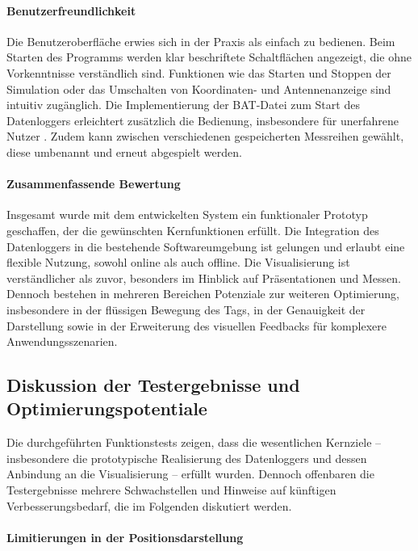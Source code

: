 \documentclass[a4paper, 12pt]{article} %
\begin{document}
\paragraph{Benutzerfreundlichkeit}
Die Benutzeroberfläche erwies sich in der Praxis als einfach zu bedienen. Beim Starten des Programms werden klar beschriftete Schaltflächen angezeigt, 
die ohne Vorkenntnisse verständlich sind. Funktionen wie das Starten und Stoppen der Simulation oder das Umschalten von Koordinaten- und Antennenanzeige 
sind intuitiv zugänglich. Die Implementierung der \ac{BAT}-Datei zum Start des Datenloggers erleichtert zusätzlich die Bedienung, insbesondere für unerfahrene
Nutzer \cite{nielsen_usability}. Zudem kann zwischen verschiedenen gespeicherten Messreihen gewählt, diese umbenannt und erneut abgespielt werden.

\paragraph{Zusammenfassende Bewertung}
Insgesamt wurde mit dem entwickelten System ein funktionaler Prototyp geschaffen, der die gewünschten Kernfunktionen erfüllt. Die Integration des 
Datenloggers in die bestehende Softwareumgebung ist gelungen und erlaubt eine flexible Nutzung, sowohl online als auch offline. Die Visualisierung 
ist verständlicher als zuvor, besonders im Hinblick auf Präsentationen und Messen. Dennoch bestehen in mehreren Bereichen Potenziale zur weiteren 
Optimierung, insbesondere in der flüssigen Bewegung des Tags, in der Genauigkeit der Darstellung sowie in der Erweiterung des visuellen Feedbacks für
komplexere Anwendungsszenarien.

\subsection{Diskussion der Testergebnisse und Optimierungspotentiale}

Die durchgeführten Funktionstests zeigen, dass die wesentlichen Kernziele – insbesondere die prototypische Realisierung des Datenloggers und 
dessen Anbindung an die Visualisierung – erfüllt wurden. Dennoch offenbaren die Testergebnisse mehrere Schwachstellen und Hinweise auf künftigen 
Verbesserungsbedarf, die im Folgenden diskutiert werden.

\paragraph{Limitierungen in der Positionsdarstellung}
\end{document}
